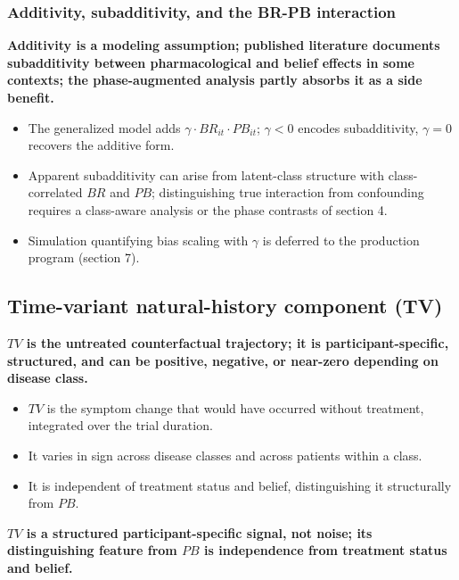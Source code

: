 \documentclass[
  11pt,
]{article}
\begin{document}
\subsubsection{Additivity, subadditivity, and the BR-PB interaction}\label{additivity-subadditivity-and-the-br-pb-interaction}

\textbf{Additivity is a modeling assumption; published literature documents subadditivity between pharmacological and belief effects in some contexts; the phase-augmented analysis partly absorbs it as a side benefit.}

\begin{itemize}\setlength{\itemsep}{2pt}\setlength{\parskip}{0pt}
\item The generalized model adds $\gamma \cdot BR_{it} \cdot PB_{it}$; $\gamma < 0$ encodes subadditivity, $\gamma = 0$ recovers the additive form.
\item Apparent subadditivity can arise from latent-class structure with class-correlated $BR$ and $PB$; distinguishing true interaction from confounding requires a class-aware analysis or the phase contrasts of section 4.
\item Simulation quantifying bias scaling with $\gamma$ is deferred to the production program (section 7).
\end{itemize}

\subsection{Time-variant natural-history component (TV)}\label{time-variant-natural-history-component-tv}

\textbf{$TV$ is the untreated counterfactual trajectory; it is participant-specific, structured, and can be positive, negative, or near-zero depending on disease class.}

\begin{itemize}\setlength{\itemsep}{2pt}\setlength{\parskip}{0pt}
\item $TV$ is the symptom change that would have occurred without treatment, integrated over the trial duration.
\item It varies in sign across disease classes and across patients within a class.
\item It is independent of treatment status and belief, distinguishing it structurally from $PB$.
\end{itemize}

\textbf{$TV$ is a structured participant-specific signal, not noise; its distinguishing feature from $PB$ is independence from treatment status and belief.}
\end{document}
